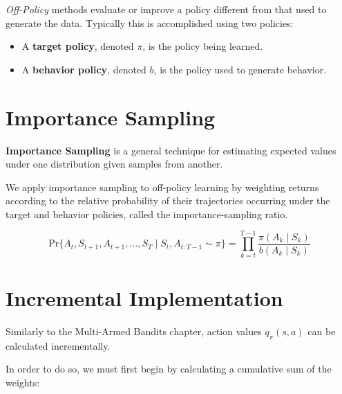 \documentclass[
  letterpaper,
  DIV=11,
  numbers=noendperiod]{scrreprt}
\begin{document}
\begin{tcolorbox}[enhanced jigsaw, toprule=.15mm, leftrule=.75mm, coltitle=black, left=2mm, opacityback=0, titlerule=0mm, arc=.35mm, toptitle=1mm, opacitybacktitle=0.6, bottomtitle=1mm, colframe=quarto-callout-tip-color-frame, title=\textcolor{quarto-callout-tip-color}{\faLightbulb}\hspace{0.5em}{Off-Policy Learning}, rightrule=.15mm, bottomrule=.15mm, colbacktitle=quarto-callout-tip-color!10!white, breakable, colback=white]

\emph{Off-Policy} methods evaluate or improve a policy different from
that used to generate the data. Typically this is accomplished using two
policies:

\begin{itemize}
\item
  A \textbf{target policy}, denoted \(\pi\), is the policy being
  learned.
\item
  A \textbf{behavior policy}, denoted \(b\), is the policy used to
  generate behavior.
\end{itemize}

\end{tcolorbox}

\section{Importance Sampling}\label{importance-sampling}

\textbf{Importance Sampling} is a general technique for estimating
expected values under one distribution given samples from another.

We apply importance sampling to off-policy learning by weighting returns
according to the relative probability of their trajectories occurring
under the target and behavior policies, called the importance-sampling
ratio.

\[
\text{Pr}\{A_{t}, S_{t+1}, A_{t+1}, \dots , S_{T} \mid S_{t}, A_{t:T-1} \sim \pi \} = \prod_{k=t}^{T-1} \frac{\pi(A_{k} \mid S_{k})}{b(A_{k} \mid S_{k})}
\]

\section{Incremental Implementation}\label{incremental-implementation}

Similarly to the Multi-Armed Bandits chapter, action values
\(q_{\pi}(s,a)\) can be calculated incrementally.

In order to do so, we must first begin by calculating a cumulative sum
of the weights:
\end{document}
